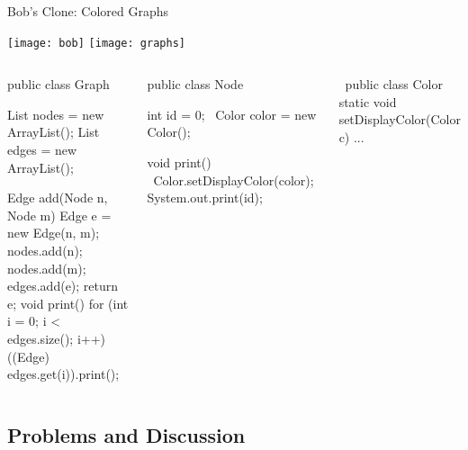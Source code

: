 \begin{frame}[fragile]{Bob's Clone: Colored Graphs}
	\vspace{-1.6cm}
	\begin{flushright}
		\texttt{[image: bob]}
		\texttt{[image: graphs]}
	\end{flushright}
	\vspace{0.1cm}
	\begin{tiny}
		\begin{columns}
				\vspace{-10mm}
\vspace{3mm}					
\begin{codetight}{}
public class Graph {
	List nodes = new ArrayList();
	List edges = new ArrayList();

	Edge add(Node n, Node m) {
		Edge e = new Edge(n, m);
		nodes.add(n); nodes.add(m); edges.add(e);
		return e;
	}
	void print() {
		for (int i = 0; i < edges.size(); i++) {
			((Edge) edges.get(i)).print();
		}
	}
}
\end{codetight}	
\begin{codetight}{}
public class Node {
	int id = 0;
	~Color color = new Color();~

	void print() {
		~Color.setDisplayColor(color);~
		System.out.print(id);
	}
}
\end{codetight}
\begin{codetight}{}
~public class Color {
	static void setDisplayColor(Color c) {...}
}~
\end{codetight}
		\end{columns}
	\end{tiny}
\end{frame}

\subsection{Problems and Discussion}

